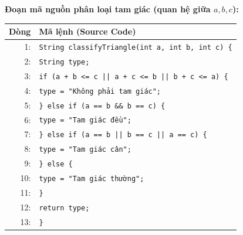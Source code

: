 \documentclass[11pt,a4paper]{article}
\begin{document}
\noindent\textbf{Đoạn mã nguồn phân loại tam giác (quan hệ giữa $a, b, c$):}
\begin{center}
\begin{minipage}{0.9\textwidth}
\begin{tabular}{|r l|}
\hline
\rowcolor{gray!15}
\textbf{Dòng} & \textbf{Mã lệnh (Source Code)} \\ \hline
1: & \texttt{String classifyTriangle(int a, int b, int c) \{} \\
2: & \quad \texttt{String type;} \\
3: & \quad \texttt{if (a + b <= c || a + c <= b || b + c <= a) \{} \\
4: & \qquad \texttt{type = "Không phải tam giác";} \\
5: & \quad \texttt{\} else if (a == b \&\& b == c) \{} \\
6: & \qquad \texttt{type = "Tam giác đều";} \\
7: & \quad \texttt{\} else if (a == b || b == c || a == c) \{} \\
8: & \qquad \texttt{type = "Tam giác cân";} \\
9: & \quad \texttt{\} else \{} \\
10: & \qquad \texttt{type = "Tam giác thường";} \\
11: & \quad \texttt{\}} \\
12: & \quad \texttt{return type;} \\
13: & \texttt{\}} \\ \hline
\end{tabular}
\end{minipage}
\end{center}
\end{document}
